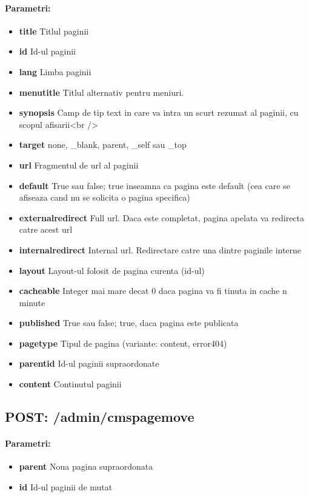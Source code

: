 \paragraph{Parametri:}
\begin{itemize}
\item \textbf{title}
 Titlul paginii
\item \textbf{id}
 Id-ul paginii
\item \textbf{lang}
 Limba paginii
\item \textbf{menutitle}
 Titlul alternativ pentru meniuri. 
\item \textbf{synopsis}
 Camp de tip text in care va intra un scurt rezumat al paginii, cu scopul afisarii<br />
\item \textbf{target}
 none, \_blank, parent, \_self sau \_top
\item \textbf{url}
 Fragmentul de url al paginii
\item \textbf{default}
 True sau false; true inseamna ca pagina este default (cea care se afiseaza cand nu se solicita o pagina specifica)
\item \textbf{externalredirect}
 Full url. Daca este completat, pagina apelata va redirecta catre acest url 
\item \textbf{internalredirect}
 Internal url. Redirectare catre una dintre paginile interne
\item \textbf{layout}
 Layout-ul folosit de pagina curenta (id-ul)
\item \textbf{cacheable}
 Integer mai mare decat 0 daca pagina va fi tinuta in cache n minute
\item \textbf{published}
 True sau false; true, daca pagina este publicata
\item \textbf{pagetype}
 Tipul de pagina (variante: content, error404)
\item \textbf{parentid}
 Id-ul paginii supraordonate
\item \textbf{content}
 Continutul paginii
 \end{itemize}
 \subsection*{POST: /admin/cmspagemove}

\paragraph{Parametri:}
\begin{itemize}
\item \textbf{parent}
 Noua pagina supraordonata
\item \textbf{id}
 Id-ul paginii de mutat
 \end{itemize}
